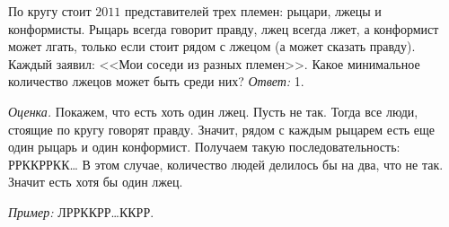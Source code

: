 \problem
По кругу стоит $2011$ представителей трех племен: рыцари, лжецы и конформисты.
Рыцарь всегда говорит правду, лжец всегда лжет, а конформист может лгать,
только если стоит рядом с лжецом (а может сказать правду).
Каждый заявил: <<Мои соседи из разных племен>>.
Какое минимальное количество лжецов может быть среди них?
\solution
\emph{Ответ:} 1.
\par
\emph{Оценка.}
Покажем, что есть хоть один лжец.
Пусть не так.
Тогда все люди, стоящие по кругу говорят правду.
Значит, рядом с каждым рыцарем есть еще один рыцарь и один конформист.
Получаем такую последовательность: РРККРРКК{\ldots}
В этом случае, количество людей делилось бы на два, что не так.
Значит есть хотя бы один лжец.
\par
\emph{Пример:} ЛРРККРР{\ldots}ККРР.
\endproblem
